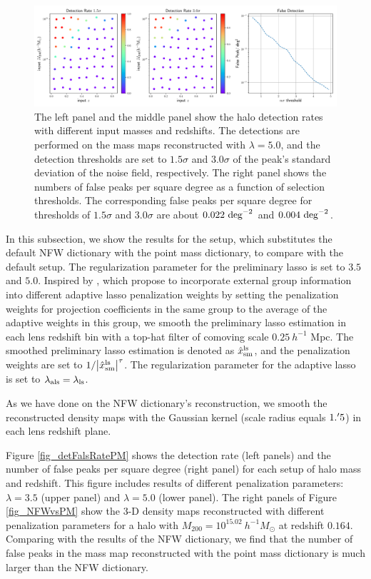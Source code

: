 \documentclass[twocolumn]{aastex62}
\begin{document}
\begin{figure}
 \includegraphics[width=1.0\textwidth]{detfalse_threshold.pdf}
 \caption{The left panel and the middle panel show the halo detection rates
     with different input masses and redshifts. The detections are performed on
     the mass maps reconstructed with $\lambda=5.0$, and the detection
     thresholds are set to $1.5\sigma$ and $3.0\sigma$ of the peak's standard
     deviation of the noise field, respectively. The right panel shows the
     numbers of false peaks per square degree as a function of selection
     thresholds. The corresponding false peaks per square degree for thresholds
     of $1.5\sigma$ and $3.0\sigma$ are about $0.022~\rm{deg}^{-2}$ and
     $0.004~\rm{deg}^{-2}$.
    }\label{fig_detfalse_threshold}
\end{figure}

In this subsection, we show the results for the setup, which substitutes the
default NFW dictionary with the point mass dictionary, to compare with the
default setup.  The regularization parameter for the preliminary lasso is set
to $3.5$ and $5.0$.  Inspired by \citet{structureAdaLasso-Pramanik2020}, which
propose to incorporate external group information into different adaptive lasso
penalization weights by setting the penalization weights for projection
coefficients in the same group to the average of the adaptive weights in this
group, we smooth the preliminary lasso estimation in each lens redshift bin
with a top-hat filter of comoving scale $0.25~h^{-1}$ Mpc. The smoothed
preliminary lasso estimation is denoted as $\hat{x}^{\rm{ls}}_{\rm{sm}}$, and
the penalization weights are set to $1/\abs{\hat{x}^{\rm{ls}}_{\rm{sm}}}^\tau$.
The regularization parameter for the adaptive lasso is set to
$\lambda_{\rm{als}}=\lambda_{\rm{ls}}$.

As we have done on the NFW dictionary's reconstruction, we smooth the
reconstructed density maps with the Gaussian kernel (scale radius equals
$1.\mbox{$^\prime$} 5$) in each lens redshift plane.

Figure \ref{fig_detFalsRatePM} shows the detection rate (left panels) and the
number of false peaks per square degree (right panel) for each setup of halo
mass and redshift.
This figure includes results of different penalization parameters:
$\lambda=3.5$ (upper panel) and $\lambda=5.0$ (lower panel). The right panels
of Figure \ref{fig_NFWvsPM} show the $3$-D density maps reconstructed with
different penalization parameters for a halo with $M_{200}=10^{15.02}
~h^{-1}M_{\odot}$ at redshift $0.164$.
Comparing with the results of the NFW dictionary, we find that the number of
false peaks in the mass map reconstructed with the point mass dictionary is
much larger than the NFW dictionary.
\end{document}

